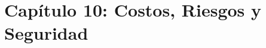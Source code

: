
\newpage
\section{Capítulo 10: Costos, Riesgos y Seguridad}\label{cap:costos_riesgos_seguridad}





